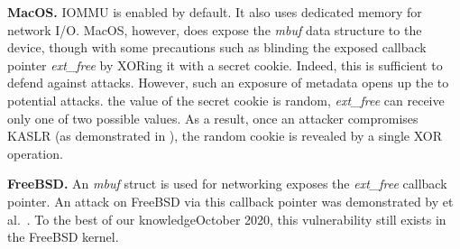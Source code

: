 \smallskip
\noindent\textbf{MacOS.} IOMMU \DIFaddbegin {}\DIFaddend is enabled by default. It also uses dedicated memory for network I/O. MacOS, however, does expose the \textit{mbuf} data structure to the device, though with some precautions such as blinding the exposed callback pointer \textit{ext\_free} by XORing it with a secret cookie.
Indeed, this is sufficient to defend against \simple attacks. However, such an exposure of metadata opens up the \DIFdelbegin {}\DIFdelend \DIFaddbegin {}\DIFaddend to potential \compound attacks.
\DIFdelbegin {}\DIFdelend \DIFaddbegin {}\DIFaddend the value of the secret cookie is random, \textit{ext\_free} can receive only one of two possible values. As a result, once an attacker compromises \DIFdelbegin {}\DIFdelend \DIFaddbegin {}\DIFaddend KASLR (as demonstrated in \cite{thunder}), the random cookie is revealed by a single XOR operation.  

\smallskip
\noindent\textbf{FreeBSD.} An \textit{mbuf} struct \DIFdelbegin {}\DIFdelend \DIFaddbegin {}\DIFaddend is used for networking exposes the \textit{ext\_free} callback pointer. An attack on FreeBSD via this callback pointer was demonstrated by \DIFdelbegin {}\DIFdelend \DIFaddbegin {}\DIFaddend et al.~\cite{thunder}. To the best of our knowledge\DIFdelbegin \DIFdel{(}\DIFdelend \DIFaddbegin {}\DIFaddend October 2020\DIFdelbegin \DIFdel{)}\DIFdelend , this vulnerability still exists in the FreeBSD kernel.

